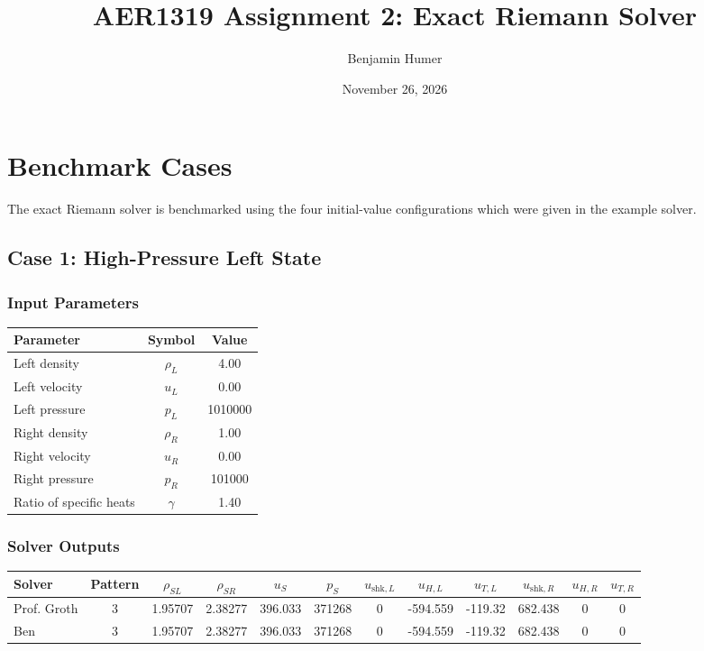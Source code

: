 \documentclass[11pt,landscape]{article}
\title{AER1319 Assignment 2: Exact Riemann Solver}
\author{Benjamin Humer}
\date{November 26, 2026}
\begin{document}
\maketitle

\section*{Benchmark Cases}

The exact Riemann solver is benchmarked using the four initial-value configurations which were given in the example solver.

\subsection*{Case 1: High-Pressure Left State}

\subsubsection*{Input Parameters}

\begin{center}
\begin{tabular}{lcc}
\toprule
Parameter & Symbol & Value \\
\midrule
Left density & $\rho_L$ & 4.00 \\
Left velocity & $u_L$ & 0.00 \\
Left pressure & $p_L$ & 1010000 \\
Right density & $\rho_R$ & 1.00 \\
Right velocity & $u_R$ & 0.00 \\
Right pressure & $p_R$ & 101000 \\
Ratio of specific heats & $\gamma$ & 1.40 \\
\bottomrule
\end{tabular}
\end{center}

\subsubsection*{Solver Outputs}

\begin{center}
\small
\begin{tabular}{lccccccccccc}
\toprule
Solver & Pattern & $\rho_{SL}$ & $\rho_{SR}$ & $u_S$ & $p_S$
& $u_{\mathrm{shk},L}$ & $u_{H,L}$ & $u_{T,L}$
& $u_{\mathrm{shk},R}$ & $u_{H,R}$ & $u_{T,R}$ \\
\midrule
Prof. Groth & 3 & 1.95707 & 2.38277 & 396.033 & 371268
& 0 & -594.559 & -119.32 & 682.438 & 0 & 0 \\

Ben & 3 & 1.95707 & 2.38277 & 396.033 & 371268
& 0 & -594.559 & -119.32 & 682.438 & 0 & 0 \\
\bottomrule
\end{tabular}
\end{center}
\end{document}
